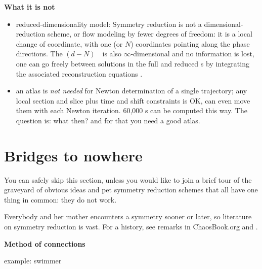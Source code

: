\documentclass[aip,cha,reprint,
secnumarabic,
nofootinbib, tightenlines,
nobibnotes, showkeys, showpacs,
]{revtex4-1}
\begin{document}
{    \ifdraft\color{blue}
{\bf What it is not}
    \begin{itemize}
      \item reduced-dimensionality model: Symmetry reduction is not a
          dimensional-reduction scheme, or flow modeling by fewer degrees
          of freedom: it is a local change of coordinate, with one (or
          $N$) coordinates pointing along the phase directions. The
          $(d\!-\!N)$\dmn\ \reducedsp\ is also $\infty$-dimensional and
          no information is lost, one can go freely between solutions in
          the full and reduced \statesp s by integrating the associated
          {reconstruction equations} .
      \item an atlas is \emph{not needed} for Newton determination of a
            single trajectory; any local section and slice plus time and shift
            constraints is OK, can even move them with each Newton
            iteration. 60,000 \rpo s can be computed this way.
            The question is: what then? and for that you need a good atlas.
    \end{itemize}



\section{Bridges to nowhere}
\label{s:bridge}

You can safely skip this section, unless you would like to join a brief
tour of the graveyard of obvious ideas and pet symmetry reduction schemes
that all have one thing in common: they do not work.

Everybody and her mother encounters a symmetry sooner or later, so
literature on symmetry reduction is vast.
For a history, see remarks in ChaosBook.org and .


{\bf Method of connections}

example: swimmer

}
\end{document}
